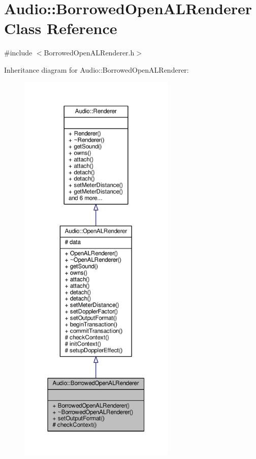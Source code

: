 \hypertarget{classAudio_1_1BorrowedOpenALRenderer}{}\section{Audio\+:\+:Borrowed\+Open\+A\+L\+Renderer Class Reference}
\label{classAudio_1_1BorrowedOpenALRenderer}


{\ttfamily \#include $<$Borrowed\+Open\+A\+L\+Renderer.\+h$>$}



Inheritance diagram for Audio\+:\+:Borrowed\+Open\+A\+L\+Renderer\+:
\nopagebreak
\begin{figure}[H]
\begin{center}
\leavevmode
\includegraphics[height=550pt]{d0/d52/classAudio_1_1BorrowedOpenALRenderer__inherit__graph}
\end{center}
\end{figure}


